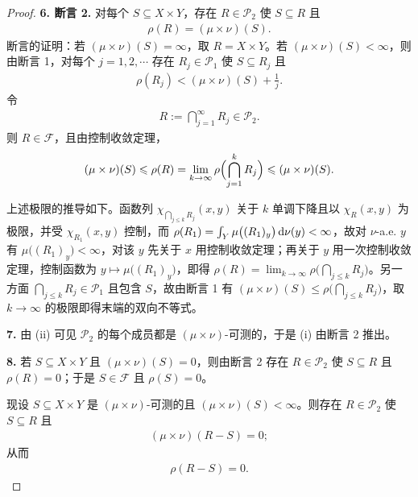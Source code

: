 \documentclass[../../main.tex]{subfiles}%
\begin{document}
\begin{proof}
\textbf{6. 断言 2.} 对每个 $S\subseteq X\times Y$，存在 $R\in\mathcal{P}_2$ 使 $S\subseteq R$ 且
\begin{align*}
\rho(R)=(\mu\times\nu)(S).
\end{align*}
断言的证明：若 $(\mu\times\nu)(S)=\infty$，取 $R=X\times Y$。若 $(\mu\times\nu)(S)<\infty$，则由断言 1，对每个 $j=1,2,\cdots$ 存在 $R_j\in\mathcal{P}_1$ 使 $S\subseteq R_j$ 且
\begin{align*}
\rho(R_j)<(\mu\times\nu)(S)+\frac1j.
\end{align*}
令
\begin{align*}
R:=\bigcap_{j=1}^{\infty}R_j\in\mathcal{P}_2.
\end{align*}
则 $R\in\mathcal{F}$，且由控制收敛定理，
\begin{align*}
(\mu\times\nu)(S)\leqslant\rho(R)=\lim_{k\to\infty}\rho\Bigl(\bigcap_{j=1}^{k}R_j\Bigr)\leqslant(\mu\times\nu)(S).
\end{align*}

上述极限的推导如下。函数列 $\chi_{\bigcap_{j\leqslant k}R_j}(x,y)$ 关于 $k$ 单调下降且以 $\chi_R(x,y)$ 为极限，并受 $\chi_{R_1}(x,y)$ 控制，而 $\rho(R_1)=\int_Y\mu\bigl((R_1)_y\bigr)\,\mathrm{d}\nu(y)<\infty$，故对 $\nu$-a.e. $y$ 有 $\mu\bigl((R_1)_y\bigr)<\infty$，对该 $y$ 先关于 $x$ 用控制收敛定理；再关于 $y$ 用一次控制收敛定理，控制函数为 $y\mapsto\mu\bigl((R_1)_y\bigr)$，即得 $\rho(R)=\lim_{k\to\infty}\rho\bigl(\bigcap_{j\leqslant k}R_j\bigr)$。另一方面 $\bigcap_{j\leqslant k}R_j\in\mathcal{P}_1$ 且包含 $S$，故由断言 1 有 $(\mu\times\nu)(S)\leqslant\rho\bigl(\bigcap_{j\leqslant k}R_j\bigr)$，取 $k\to\infty$ 的极限即得末端的双向不等式。

\textbf{7.} 由 (ii) 可见 $\mathcal{P}_2$ 的每个成员都是 $(\mu\times\nu)$-可测的，于是 (i) 由断言 2 推出。

\textbf{8.} 若 $S\subseteq X\times Y$ 且 $(\mu\times\nu)(S)=0$，则由断言 2 存在 $R\in\mathcal{P}_2$ 使 $S\subseteq R$ 且 $\rho(R)=0$；于是 $S\in\mathcal{F}$ 且 $\rho(S)=0$。

现设 $S\subseteq X\times Y$ 是 $(\mu\times\nu)$-可测的且 $(\mu\times\nu)(S)<\infty$。则存在 $R\in\mathcal{P}_2$ 使 $S\subseteq R$ 且
\begin{align*}
(\mu\times\nu)(R-S)=0;
\end{align*}
从而
\begin{align*}
\rho(R-S)=0.
\end{align*}


\end{proof}
\end{document}

